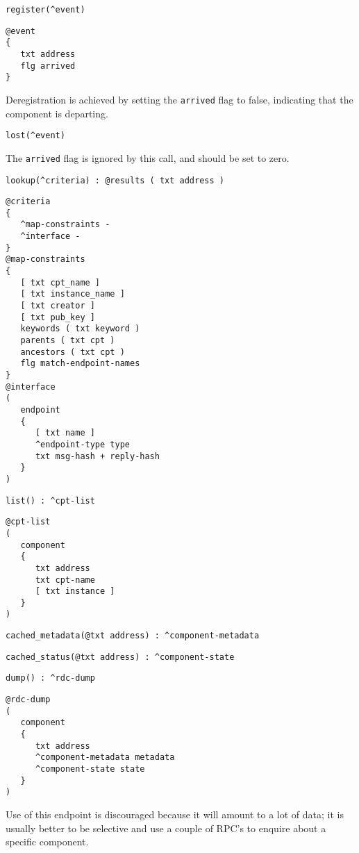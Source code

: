 \documentclass[12pt,a4paper,twoside]{article}
\renewcommand{\_}{\texttt{\symbol{95}}}
\begin{document}
\begin{bulletlist}

\item \verb~register(^event)~

\begin{verbatim}
@event
{
   txt address
   flg arrived
}
\end{verbatim}

Deregistration is achieved by setting the \verb^arrived^ flag to
false, indicating that the component is departing.

\item \verb~lost(^event)~

The \verb^arrived^ flag is ignored by this call, and should be set to zero.

\item \verb~lookup(^criteria) : @results ( txt address )~

\begin{verbatim}
@criteria
{
   ^map-constraints -
   ^interface -
}              
@map-constraints
{
   [ txt cpt_name ]
   [ txt instance_name ]
   [ txt creator ]
   [ txt pub_key ]
   keywords ( txt keyword )
   parents ( txt cpt )
   ancestors ( txt cpt )
   flg match-endpoint-names
}
@interface
(
   endpoint
   {
      [ txt name ]
      ^endpoint-type type
      txt msg-hash + reply-hash
   }
)
\end{verbatim}

\item \verb~list() : ^cpt-list~

\begin{verbatim}
@cpt-list
(
   component
   {
      txt address
      txt cpt-name
      [ txt instance ]
   }
)
\end{verbatim}

\item \verb~cached_metadata(@txt address) : ^component-metadata~

\item \verb~cached_status(@txt address) : ^component-state~

\item \verb~dump() : ^rdc-dump~

\begin{verbatim}
@rdc-dump
(
   component
   {
      txt address
      ^component-metadata metadata
      ^component-state state
   }
)
\end{verbatim}

Use of this endpoint is discouraged because it will amount to a lot of
data; it is usually better to be selective and use a couple of
RPC's to enquire about a specific component.


\end{bulletlist}
\end{document}
